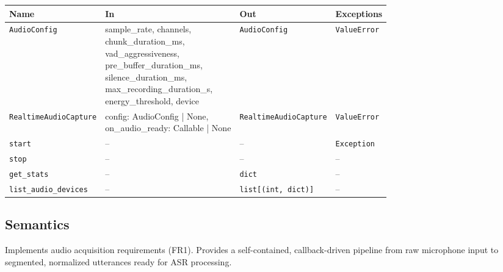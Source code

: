 \documentclass[12pt, titlepage]{article}
\begin{document}
\begin{tabular}{|l|l|l|l|}
\hline
\textbf{Name} & \textbf{In} & \textbf{Out} & \textbf{Exceptions} \\ \hline
\texttt{AudioConfig} &
  \makecell[l]{sample\_rate, channels, \\ chunk\_duration\_ms, \\ vad\_aggressiveness, \\ pre\_buffer\_duration\_ms, \\ silence\_duration\_ms, \\ max\_recording\_duration\_s, \\ energy\_threshold, device} &
  \texttt{AudioConfig} &
  \texttt{ValueError} \\ \hline
\texttt{RealtimeAudioCapture} &
  \makecell[l]{config: AudioConfig | None, \\ on\_audio\_ready: Callable | None} &
  \texttt{RealtimeAudioCapture} &
  \texttt{ValueError} \\ \hline
\texttt{start}  & -- & -- & \texttt{Exception} \\ \hline
\texttt{stop}   & -- & -- & -- \\ \hline
\texttt{get\_stats} & -- & \texttt{dict} & -- \\ \hline
\texttt{list\_audio\_devices} & -- & \texttt{list[(int, dict)]} & -- \\ \hline
\end{tabular}

\subsection{Semantics}

Implements audio acquisition requirements (FR1). Provides a self-contained, callback-driven pipeline from raw microphone input to segmented, normalized utterances ready for ASR processing.
\end{document}
